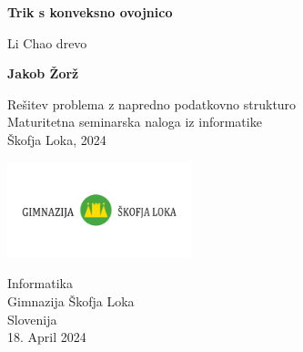 \documentclass[a4paper]{article}
\begin{document}
    \begin{titlepage}
    \begin{center}
       \vspace*{1cm}

       \textbf{Trik s konveksno ovojnico}

       \vspace{0.5cm}
       Li Chao drevo
       \vspace{1.5cm}

       \textbf{Jakob Žorž}

       \vfill

       Rešitev problema z napredno podatkovno strukturo\\
       Maturitetna seminarska naloga iz informatike\\
       Škofja Loka, 2024

       \vspace{0.8cm}

       \includegraphics[width=0.4\textwidth]{gimnazija}

       Informatika\\
       Gimnazija Škofja Loka\\
       Slovenija\\
       18.
       April 2024

    \end{center}
    \end{titlepage}

    \clearpage

    \printindex

    \clearpage

    
    
    
    
    
    
\end{document}
